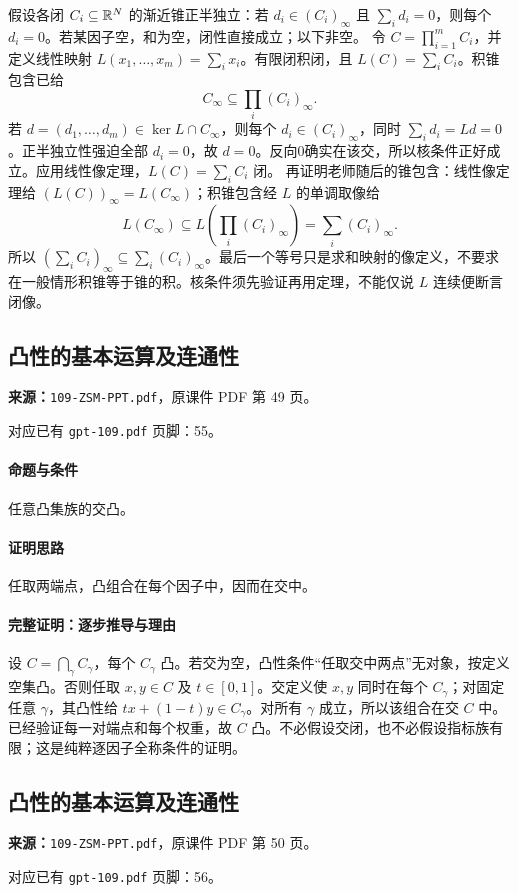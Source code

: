 假设各闭 $C_i\subseteq\mathbb{R}^N$ 的渐近锥正半独立：若 $d_i\in(C_i)_\infty$ 且 $\sum_i d_i=0$，则每个 $d_i=0$。若某因子空，和为空，闭性直接成立；以下非空。
令 $C=\prod_{i=1}^mC_i$，并定义线性映射 $L(x_1,\ldots,x_m)=\sum_i x_i$。有限闭积闭，且 $L(C)=\sum_iC_i$。积锥包含已给
\[C_\infty\subseteq\prod_i(C_i)_\infty.\]
若 $d=(d_1,\ldots,d_m)\in\ker L\cap C_\infty$，则每个 $d_i\in(C_i)_\infty$，同时 $\sum_id_i=Ld=0$。正半独立性强迫全部 $d_i=0$，故 $d=0$。反向0确实在该交，所以核条件正好成立。应用线性像定理，$L(C)=\sum_iC_i$ 闭。
再证明老师随后的锥包含：线性像定理给 $(L(C))_\infty=L(C_\infty)$；积锥包含经 $L$ 的单调取像给
\[L(C_\infty)\subseteq L\left(\prod_i(C_i)_\infty\right)=\sum_i(C_i)_\infty.\]
所以 $(\sum_iC_i)_\infty\subseteq\sum_i(C_i)_\infty$。最后一个等号只是求和映射的像定义，不要求在一般情形积锥等于锥的积。核条件须先验证再用定理，不能仅说 $L$ 连续便断言闭像。

\clearpage\subsection{凸性的基本运算及连通性}
\textbf{来源：}\texttt{109-ZSM-PPT.pdf}，原课件 PDF 第 49 页。\par
对应已有 \texttt{gpt-109.pdf} 页脚：55。\par
\paragraph{命题与条件}任意凸集族的交凸。
\paragraph{证明思路}任取两端点，凸组合在每个因子中，因而在交中。
\paragraph{完整证明：逐步推导与理由}

设 $C=\bigcap_\gamma C_\gamma$，每个 $C_\gamma$ 凸。若交为空，凸性条件“任取交中两点”无对象，按定义空集凸。否则任取 $x,y\in C$ 及 $t\in[0,1]$。交定义使 $x,y$ 同时在每个 $C_\gamma$；对固定任意 $\gamma$，其凸性给 $tx+(1-t)y\in C_\gamma$。对所有 $\gamma$ 成立，所以该组合在交 $C$ 中。
已经验证每一对端点和每个权重，故 $C$ 凸。不必假设交闭，也不必假设指标族有限；这是纯粹逐因子全称条件的证明。

\clearpage\subsection{凸性的基本运算及连通性}
\textbf{来源：}\texttt{109-ZSM-PPT.pdf}，原课件 PDF 第 50 页。\par
对应已有 \texttt{gpt-109.pdf} 页脚：56。\par
